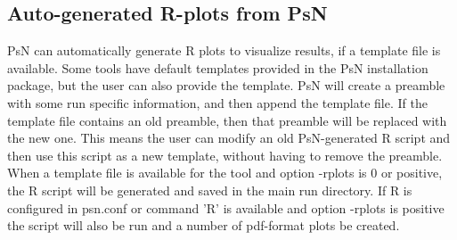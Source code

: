 \subsection{Auto-generated R-plots from PsN}
PsN can automatically generate R plots to visualize results, if a template file is available.
Some tools have default templates provided in the PsN installation package, but the
user can also provide the template.
PsN will create a preamble with some run specific information, and then append the template file.
If the template file contains an old preamble, then that preamble will be replaced with the new one. This means
the user can modify an old PsN-generated R script and then use this script as a new template,
without having to remove the preamble.
When a template file is available for the tool and option -rplots is 0 or positive, 
the R script will be generated and saved in the main
run directory. If R is configured in psn.conf or command 'R' is available and option -rplots is positive the script will
also be run and a number of pdf-format plots be created.

